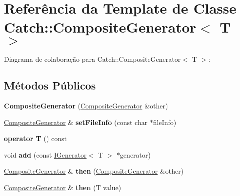 \hypertarget{classCatch_1_1CompositeGenerator}{}\section{Referência da Template de Classe Catch\+:\+:Composite\+Generator$<$ T $>$}
\label{classCatch_1_1CompositeGenerator}


Diagrama de colaboração para Catch\+:\+:Composite\+Generator$<$ T $>$\+:
\subsection*{Métodos Públicos}
\begin{DoxyCompactItemize}
\item 
{\bfseries Composite\+Generator} (\hyperlink{classCatch_1_1CompositeGenerator}{Composite\+Generator} \&other)\hypertarget{classCatch_1_1CompositeGenerator_a21a7070a00e4a6fe021294c356692692}{}\label{classCatch_1_1CompositeGenerator_a21a7070a00e4a6fe021294c356692692}

\item 
\hyperlink{classCatch_1_1CompositeGenerator}{Composite\+Generator} \& {\bfseries set\+File\+Info} (const char $\ast$file\+Info)\hypertarget{classCatch_1_1CompositeGenerator_ac3c57cf4ca5472f440bf71e2936bcd4a}{}\label{classCatch_1_1CompositeGenerator_ac3c57cf4ca5472f440bf71e2936bcd4a}

\item 
{\bfseries operator T} () const \hypertarget{classCatch_1_1CompositeGenerator_aa3f627d84fb256df0404d19d7fd4b784}{}\label{classCatch_1_1CompositeGenerator_aa3f627d84fb256df0404d19d7fd4b784}

\item 
void {\bfseries add} (const \hyperlink{structCatch_1_1IGenerator}{I\+Generator}$<$ T $>$ $\ast$generator)\hypertarget{classCatch_1_1CompositeGenerator_af3774d42ad2d3453d089ca599efe0517}{}\label{classCatch_1_1CompositeGenerator_af3774d42ad2d3453d089ca599efe0517}

\item 
\hyperlink{classCatch_1_1CompositeGenerator}{Composite\+Generator} \& {\bfseries then} (\hyperlink{classCatch_1_1CompositeGenerator}{Composite\+Generator} \&other)\hypertarget{classCatch_1_1CompositeGenerator_a2e03f42df85cdd238aabd77a80b075d5}{}\label{classCatch_1_1CompositeGenerator_a2e03f42df85cdd238aabd77a80b075d5}

\item 
\hyperlink{classCatch_1_1CompositeGenerator}{Composite\+Generator} \& {\bfseries then} (T value)\hypertarget{classCatch_1_1CompositeGenerator_aefdc11bcfccdf07d2db5f0da3ed8758c}{}\label{classCatch_1_1CompositeGenerator_aefdc11bcfccdf07d2db5f0da3ed8758c}

\end{DoxyCompactItemize}
